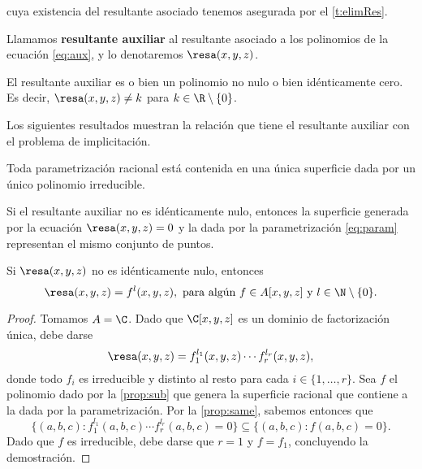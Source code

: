 cuya existencia del resultante asociado tenemos asegurada por el \autoref{t:elimRes}.
\begin{definicion}
    Llamamos \textbf{resultante auxiliar} al resultante asociado a los polinomios de la ecuación \eqref{eq:aux}, y lo denotaremos $\resa(x,y,z)$.
\end{definicion}
\begin{proposicion}
    El resultante auxiliar es o bien un polinomio no nulo o bien idénticamente cero. Es decir, $\resa(x,y,z) \neq k$ para $k\in \R\setminus \{0\}$.
\end{proposicion}
Los siguientes resultados muestran la relación que tiene el resultante auxiliar con el problema de implicitación.
\begin{proposicion}\label{prop:sub}
    Toda parametrización racional está contenida en una única superficie dada por un único polinomio irreducible.
\end{proposicion}
\begin{proposicion}\label{prop:same}
    Si el resultante auxiliar  no es idénticamente nulo, entonces la superficie generada por la ecuación $\resa(x,y,z)=0$ y la dada por la parametrización \eqref{eq:param} representan el mismo conjunto de puntos.
\end{proposicion}
\begin{teorema}\label{t:potencia}
    Si $\resa(x,y,z)$ no es idénticamente nulo, entonces
    \begin{equation*}
        \resa(x,y,z) = f^l(x,y,z),\text{ para algún } f\in A[x,y,z] \text{ y } l\in \N\setminus\{0\}.
    \end{equation*}
\end{teorema}
\begin{proof}
    Tomamos $A=\C$. Dado que $\C[x,y,z]$ es un dominio de factorización única, debe darse
    \begin{equation*}
        \resa(x,y,z) = f_1^{l_1}(x,y,z)\cdots f_r^{l_r}(x,y,z),
    \end{equation*}
    donde todo $f_i$ es irreducible y distinto al resto para cada $i\in \{1,\dots, r\}$. Sea $f$ el polinomio dado por la \autoref{prop:sub} que genera la superficie racional que contiene a la dada por la parametrización. Por la \autoref{prop:same}, sabemos entonces que 
    \begin{equation*}
        \{(a,b,c) :  f_1^{l_1}(a,b,c)\cdots f_r^{l_r}(a,b,c) = 0\} \subseteq \{(a,b,c) : f(a,b,c) = 0\}.
    \end{equation*}
    Dado que $f$ es irreducible, debe darse que $r=1$ y $f=f_1$, concluyendo la demostración.
\end{proof}
